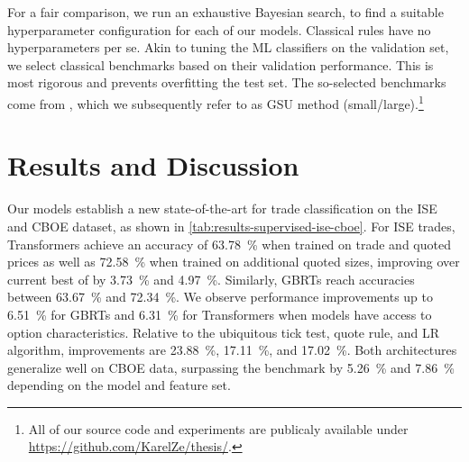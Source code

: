 \documentclass[oneside,a4paper,10pt]{article} %
\begin{document}
For a fair comparison, we run an exhaustive Bayesian search, to find a suitable hyperparameter configuration for each of our models. Classical rules have no hyperparameters per se. Akin to tuning the \gls{ML} classifiers on the validation set, we select classical benchmarks based on their validation performance. This is most rigorous and prevents overfitting the test set. The so-selected benchmarks come from \textcite{grauerOptionTradeClassification2022}, which we subsequently refer to as \gls{GSU} method (small/large).\footnote{All of our source code and experiments are publicaly available under \url{https://github.com/KarelZe/thesis/}.}

\section{Results and Discussion}

Our models establish a new state-of-the-art for trade classification on the \gls{ISE} and \gls{CBOE} dataset, as shown in \cref{tab:results-supervised-ise-cboe}. For \gls{ISE} trades, Transformers achieve an accuracy of \SI{63.78}{\percent} when trained on trade and quoted prices as well as \SI{72.58}{\percent} when trained on additional quoted sizes, improving over current best of \textcite[][]{grauerOptionTradeClassification2022} by \SI{3.73}{\percent} and \SI{4.97}{\percent}. Similarly, \glspl{GBRT} reach accuracies between \SI{63.67}{\percent} and \SI{72.34}{\percent}. We observe performance improvements up to \SI{6.51}{\percent} for \glspl{GBRT} and \SI{6.31}{\percent} for Transformers when models have access to option characteristics. Relative to the ubiquitous tick test, quote rule, and \gls{LR} algorithm, improvements are \SI{23.88}{\percent}, \SI{17.11}{\percent}, and \SI{17.02}{\percent}. Both architectures generalize well on \gls{CBOE} data, surpassing the benchmark by \SI{5.26}{\percent} and \SI{7.86}{\percent} depending on the model and feature set. 
\end{document}
